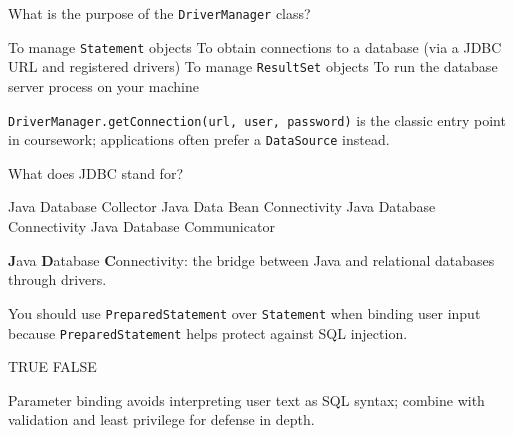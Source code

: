 \question[4]
What is the purpose of the \texttt{DriverManager} class?
\begin{choices}
  \choice To manage \texttt{Statement} objects
  \CorrectChoice To obtain connections to a database (via a JDBC URL and registered drivers)
  \choice To manage \texttt{ResultSet} objects
  \choice To run the database server process on your machine
\end{choices}
\begin{solution}
  \texttt{DriverManager.getConnection(url, user, password)} is the classic entry point in coursework; applications often prefer a \texttt{DataSource} instead.
\end{solution}

\question[4]
What does JDBC stand for?
\begin{choices}
  \choice Java Database Collector
  \choice Java Data Bean Connectivity
  \CorrectChoice Java Database Connectivity
  \choice Java Database Communicator
\end{choices}
\begin{solution}
  \textbf{J}ava \textbf{D}atabase \textbf{C}onnectivity: the bridge between Java and relational databases through drivers.
\end{solution}

\question[4]
You should use \texttt{PreparedStatement} over \texttt{Statement} when binding user input because \texttt{PreparedStatement} helps protect against SQL injection.
\begin{choices}
  \CorrectChoice TRUE
  \choice FALSE
\end{choices}
\begin{solution}
  Parameter binding avoids interpreting user text as SQL syntax; combine with validation and least privilege for defense in depth.
\end{solution}

